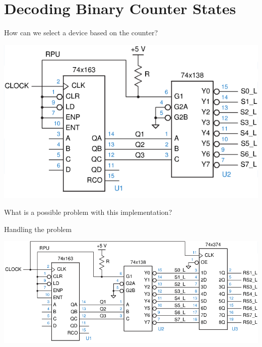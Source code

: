 \section{Decoding Binary Counter States}

\begin{frame}{How can we select a device based on the counter?}
  \begin{center}
    \includegraphics[scale=0.5]{CounterDecoder}
  \end{center}
  What is a possible problem with this implementation?
\end{frame}

\begin{frame}{Handling the problem}
  \begin{center}
    \includegraphics[scale=0.35]{CounterDecoderRegister}
  \end{center}
\end{frame}


